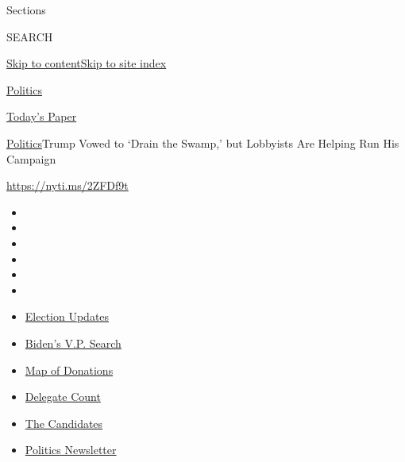 Sections

SEARCH

\protect\hyperlink{site-content}{Skip to
content}\protect\hyperlink{site-index}{Skip to site index}

\href{https://www.nytimes.com/section/politics}{Politics}

\href{https://myaccount.nytimes.com/auth/login?response_type=cookie\&client_id=vi}{}

\href{https://www.nytimes.com/section/todayspaper}{Today's Paper}

\href{/section/politics}{Politics}\textbar{}Trump Vowed to `Drain the
Swamp,' but Lobbyists Are Helping Run His Campaign

\url{https://nyti.ms/2ZFDf9t}

\begin{itemize}
\item
\item
\item
\item
\item
\item
\end{itemize}

\begin{itemize}
\item
  \href{https://www.nytimes.com/2020/07/31/us/elections/biden-vs-trump.html?action=click\&pgtype=Article\&state=default\&region=TOP_BANNER\&context=storylines_menu}{Election
  Updates}
\item
  \href{https://www.nytimes.com/article/biden-vice-president-2020.html?action=click\&pgtype=Article\&state=default\&region=TOP_BANNER\&context=storylines_menu}{Biden's
  V.P. Search}
\item
  \href{https://www.nytimes.com/interactive/2020/07/24/us/politics/trump-biden-campaign-donors.html?action=click\&pgtype=Article\&state=default\&region=TOP_BANNER\&context=storylines_menu}{Map
  of Donations}
\item
  \href{https://www.nytimes.com/interactive/2020/us/elections/delegate-count-primary-results.html?action=click\&pgtype=Article\&state=default\&region=TOP_BANNER\&context=storylines_menu}{Delegate
  Count}
\item
  \href{https://www.nytimes.com/interactive/2019/us/politics/2020-presidential-candidates.html?action=click\&pgtype=Article\&state=default\&region=TOP_BANNER\&context=storylines_menu}{The
  Candidates}
\item
  \href{https://www.nytimes.com/newsletters/politics?action=click\&pgtype=Article\&state=default\&region=TOP_BANNER\&context=storylines_menu}{Politics
  Newsletter}
\end{itemize}

